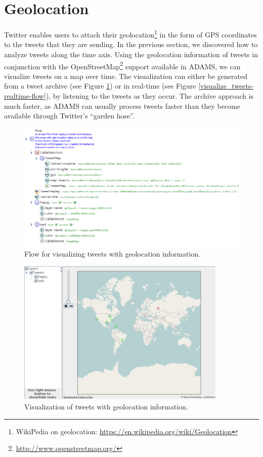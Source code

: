 \documentclass[a4paper,10pt]{book}
\begin{document}
\clearpage
\newpage
\section{Geolocation}
Twitter enables users to attach their geolocation\footnote{WikiPedia on geolocation: \url{https://en.wikipedia.org/wiki/Geolocation}{}} in the form of GPS coordinates to the tweets that they are sending. In the previous section, we discovered how to analyze tweets along the time axis. Using the geolocation information of tweets in conjunction with the OpenStreetMap\footnote{\url{http://www.openstreetmap.org/}{}} support available in ADAMS, we can visualize tweets on a map over time. The visualization can either be generated from a tweet archive (see Figure \ref{visualize_tweets-archive-flow}) or in real-time (see Figure \ref{visualize_tweets-realtime-flow}), by listening to the tweets as they occur. The archive approach is much faster, as ADAMS can usually process tweets faster than they become available through Twitter's ``garden hose''.

\begin{figure}[htb]
  \centering
  \includegraphics[width=12.0cm]{images/visualize_tweets-archive-flow.png}
  \caption{Flow for visualizing tweets with geolocation information.}
  \label{visualize_tweets-archive-flow}
\end{figure}

\begin{figure}[htb]
  \centering
  \includegraphics[width=10.0cm]{images/visualize_tweets-archive-output.png}
  \caption{Visualization of tweets with geolocation information.}
  \label{visualize_tweets-archive-output}
\end{figure}
\end{document}
